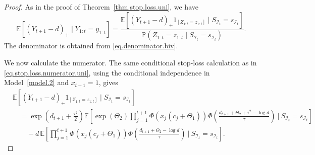 \documentclass[11pt,authoryear]{elsarticle}
\def\P#1{{\mathbb{P}}\left(#1\right)}
\def\E#1{{\mathbb E}\left[#1\right]}
\theoremstyle{nopunct}
\numberwithin{equation}{section}
\begin{document}
\begin{proof}
As in the proof of Theorem~\ref{thm.stop.loss.uni}, we have
\[
\E{
(Y_{t+1}-d)_+
\mid
Y_{1:t}=y_{1:t}
}
=
\frac{
\E{
(Y_{t+1}-d)_+
1_{\left[Z_{1:t}=z_{1:t}\right]}
\mid
S_{\mathcal I_t}=s_{\mathcal I_t}
}
}{
\P{
Z_{1:t}=z_{1:t}
\mid
S_{\mathcal I_t}=s_{\mathcal I_t}
}
}.
\]
The denominator is obtained from \eqref{eq.denominator.biv}.

We now calculate the numerator.
The same conditional stop-loss calculation as in
\eqref{eq.stop.loss.numerator.uni}, using the conditional
independence in Model~\ref{model.2} and \(x_{t+1}=1\), gives
\begin{equation}\label{eq.25}
\begin{aligned}
&\E{
(Y_{t+1}-d)_+
1_{\left[Z_{1:t}=z_{1:t}\right]}
\mid
S_{\mathcal I_t}=s_{\mathcal I_t}
}\\
&\quad=
\exp\left(
d_{t+1}+\frac{\tau^2}{2}
\right)
\E{
\exp(\Theta_2)
\prod_{j=1}^{t+1}
\Phi\left(
x_j(c_j+\Theta_1)
\right)
\Phi\left(
\frac{
d_{t+1}+\Theta_2+\tau^2-\log d
}{\tau}
\right)
\ \bigg|\
S_{\mathcal I_t}=s_{\mathcal I_t}
}\\
&\qquad-
d\,
\E{
\prod_{j=1}^{t+1}
\Phi\left(
x_j(c_j+\Theta_1)
\right)
\Phi\left(
\frac{
d_{t+1}+\Theta_2-\log d
}{\tau}
\right)
\ \bigg|\
S_{\mathcal I_t}=s_{\mathcal I_t}
}.
\end{aligned}
\end{equation}


\end{proof}
\end{document}
